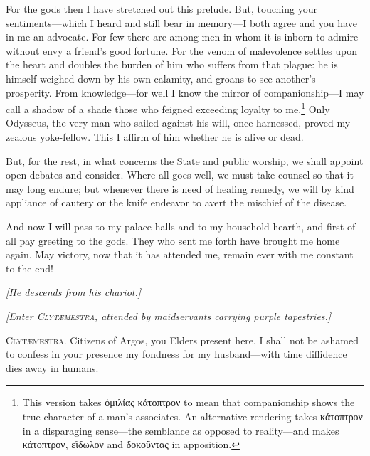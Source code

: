 \documentclass[12pt]{article}
\begin{document}
For the gods then I have stretched out this prelude. But, touching your sen\-ti\-ments---which I heard and still bear in memory---I both agree and you have in me an advocate. For few there are among men in whom it is inborn to admire without envy a friend's good fortune. For the venom of malevolence settles upon the heart and doubles the burden of him who suffers from that plague: he is himself weighed down by his own calamity, and groans to see another's prosperity. From knowledge---for well I know the mirror of companionship---I may call a shadow of a shade those who feigned exceeding loyalty to me.\footnote{This version takes ὁμιλίας κάτοπτρον to mean that companionship shows the true character of a man's associates. An alternative rendering takes κάτοπτρον in a disparaging sense---the semblance as opposed to reality---and makes κάτοπτρον, εἴδωλον and δοκοῦντας in apposition.} Only Odysseus, the very man who sailed against his will, once harnessed, proved my zealous yoke-fellow. This I affirm of him whether he is alive or dead.

But, for the rest, in what concerns the State and public worship, we shall appoint open debates and consider. Where all goes well, we must take counsel so that it may long endure; but whenever there is need of healing remedy, we will by kind appliance of cautery or the knife endeavor to avert the mischief of the disease.

And now I will pass to my palace halls and to my household hearth, and first of all pay greeting to the gods. They who sent me forth have brought me home again. May victory, now that it has attended me, remain ever with me constant to the end!

\begin{center}
\textit{[He descends from his chariot.]}
\end{center}

\begin{center}
\textit{[Enter \textsc{Clyt{\ae}mestra,} attended by maidservants carrying purple tapestries.]}
\end{center}

\textsc{Clyt{\ae}mestra.} Citizens of Argos, you Elders present here, I shall not be ashamed to confess in your presence my fondness for my husband---with time diffidence dies away in humans.
\end{document}
